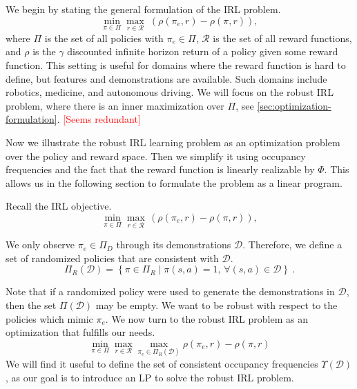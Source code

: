 \documentclass[11pt]{uai2023}
\newcommand{\gersi}[1]{\textcolor{red}{[#1]}}
\begin{document}
We begin by stating the general formulation of the IRL problem.
\begin{equation}
	\min_{\pi \in \Pi} \max_{r \in \mathcal{R}} \; (\rho(\pi_e, r) - \rho(\pi, r)),
\end{equation}
where $\Pi$ is the set of all policies with $\pi_e \in \Pi$, $\mathcal{R}$ is the set of all reward functions, and $\rho$ is the $\gamma$ discounted infinite horizon
return of a policy given some reward function. This setting is useful for domains where the reward function is hard to define, 
but features and demonstrations are available. Such domains include robotics, medicine, and autonomous driving. 
We will focus on the robust IRL problem, where there is an inner maximization over $\Pi$, see \cref{sec:optimization-formulation}. \gersi{Seems redundant}

Now we illustrate the robust IRL learning problem as an optimization problem over the policy and reward space. Then we simplify it using occupancy frequencies
and the fact that the reward function is linearly realizable by $\Phi$. This allows us in the following section to formulate the problem as a linear program.

Recall the IRL objective.
\begin{equation}
	\min_{\pi \in \Pi} \max_{r \in \mathcal{R}}  \, (\rho(\pi_e, r) - \rho(\pi, r)),
\end{equation}

We only observe $\pi_e \in \Pi_D$ through its demonstrations $\mathcal{D}$. Therefore, we define a set of randomized policies that are consistent with $\mathcal{D}$.
%
\begin{equation} \label{eq:consistent-policies}
	\Pi_R(\mathcal{D}) = \left\{ \pi \in \Pi_R \mid \pi(s,a) = 1, \, \forall (s,a) \in \mathcal{D} \right\}~.
\end{equation}

Note that if a randomized policy were used to generate the demonstrations in
$\mathcal{D}$, then the set $\Pi(\mathcal{D})$ may be empty. We want to be robust with respect to the policies which mimic $\pi_e$.
We now turn to the robust IRL problem as an optimization that fulfills our needs.
%
\begin{equation}
	\label{eq:robust_IRL_formulation}
	\min_{\pi \in \Pi} \max_{r \in \mathcal{R}} \max_{\pi_e \in \Pi_{R}(\mathcal{D})} \rho(\pi_e, r) - \rho(\pi, r)
\end{equation}
%
We will find it useful to define the set of consistent occupancy frequencies $\Upsilon(\mathcal{D})$, as our goal is to introduce an LP to solve
the robust IRL problem.
\end{document}
